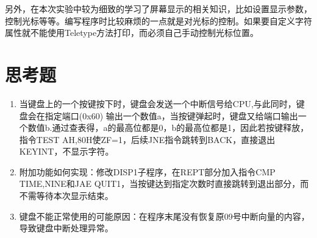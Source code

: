 \documentclass[12pt, a4paper, oneside]{ctexart}
\begin{document}
另外，在本次实验中较为细致的学习了屏幕显示的相关知识，比如设置显示参数，控制光标等等。编写程序时比较麻烦的一点就是对光标的控制。如果要自定义字符属性就不能使用Teletype方法打印，而必须自己手动控制光标位置。
\section{思考题}

\begin{enumerate}
    \item 当键盘上的一个按键按下时，键盘会发送一个中断信号给CPU,与此同时，键盘会在指定端口(0x60) 输出一个数值a，当按键弹起时，键盘又给端口输出一个数值b.通过查表得，a的最高位都是0，b的最高位都是1，因此若按键释放，指令TEST AH,80H使ZF=1，后续JNE指令跳转到BACK，直接退出KEYINT，不显示字符。
    \item 附加功能如何实现：修改DISP1子程序，在REPT部分加入指令CMP TIME,NINE和JAE QUIT1，当按键达到指定次数时直接跳转到退出部分，而不需等待本次显示结束。
    \item 键盘不能正常使用的可能原因：在程序末尾没有恢复原09号中断向量的内容，导致键盘中断处理异常。
\end{enumerate}
\end{document}
